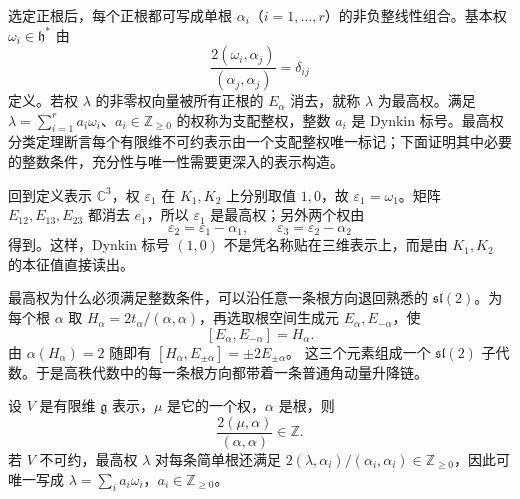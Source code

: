 \begin{definition}
选定正根后，每个正根都可写成单根 $\alpha_i$（$i=1,\dots,r$）的非负整线性组合。基本权 $\omega_i\in\mathfrak h^*$ 由
\[
\frac{2(\omega_i,\alpha_j)}{(\alpha_j,\alpha_j)}=\delta_{ij}
\]
定义。若权 $\lambda$ 的非零权向量被所有正根的 $E_\alpha$ 消去，就称 $\lambda$ 为最高权。满足 $\lambda=\sum_{i=1}^r a_i\omega_i$、$a_i\in\mathbb Z_{\ge0}$ 的权称为支配整权，整数 $a_i$ 是 Dynkin 标号。最高权分类定理断言每个有限维不可约表示由一个支配整权唯一标记；下面证明其中必要的整数条件，充分性与唯一性需要更深入的表示构造。
\end{definition}

回到定义表示 $\mathbb C^3$，权 $\varepsilon_1$ 在 $K_1,K_2$ 上分别取值 $1,0$，故 $\varepsilon_1=\omega_1$。矩阵 $E_{12},E_{13},E_{23}$ 都消去 $e_1$，所以 $\varepsilon_1$ 是最高权；另外两个权由
\[
\varepsilon_2=\varepsilon_1-\alpha_1,\qquad
\varepsilon_3=\varepsilon_2-\alpha_2
\]
得到。这样，Dynkin 标号 $(1,0)$ 不是凭名称贴在三维表示上，而是由 $K_1,K_2$ 的本征值直接读出。

最高权为什么必须满足整数条件，可以沿任意一条根方向退回熟悉的
$\mathfrak{sl}(2)$。为每个根 $\alpha$ 取 $H_\alpha=2t_\alpha/(\alpha,\alpha)$，再选取根空间生成元 $E_\alpha,E_{-\alpha}$，使
\[
[E_\alpha,E_{-\alpha}]=H_\alpha.
\]
由 $\alpha(H_\alpha)=2$ 随即有 $[H_\alpha,E_{\pm\alpha}]=\pm2E_{\pm\alpha}$。
这三个元素组成一个 $\mathfrak{sl}(2)$ 子代数。于是高秩代数中的每一条根方向都带着一条普通角动量升降链。

\begin{theorem}[权的整性与最高权的支配性]
设 $V$ 是有限维 $\mathfrak g$ 表示，$\mu$ 是它的一个权，$\alpha$ 是根，则
\begin{equation}
\frac{2(\mu,\alpha)}{(\alpha,\alpha)}\in\mathbb Z.
\label{eq:root-string-integrality}
\end{equation}
若 $V$ 不可约，最高权 $\lambda$ 对每条简单根还满足
$2(\lambda,\alpha_i)/(\alpha_i,\alpha_i)\in\mathbb Z_{\ge0}$，因此可唯一写成 $\lambda=\sum_i a_i\omega_i$，$a_i\in\mathbb Z_{\ge0}$。
\end{theorem}

